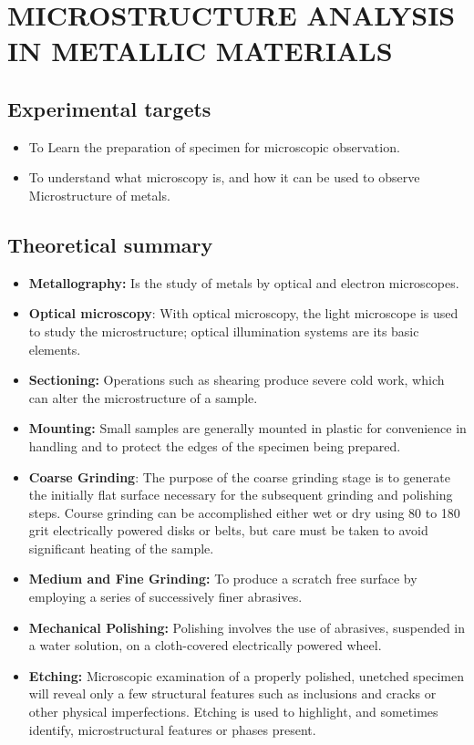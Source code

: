 \chapter{MICROSTRUCTURE ANALYSIS IN METALLIC MATERIALS}
\section{Experimental targets}
\begin{itemize}
	\item To Learn the preparation of specimen for microscopic observation.
	\item To understand what microscopy is, and how it can be used to observe Microstructure of metals.
\end{itemize}
\section{Theoretical summary}
\begin{itemize}
	\item \textbf{Metallography:} Is the study of metals by optical and electron microscopes.
	\item \textbf{Optical microscopy}: With  optical  microscopy,  the  light  microscope  is  used  to  study  the microstructure; optical illumination systems are its basic elements.
	\item \textbf{Sectioning:} Operations  such  as  shearing  produce  severe  cold  work,  which  can  alter  the microstructure of a sample.
	\item \textbf{Mounting:} Small samples are generally mounted in plastic for convenience in handling and to protect the edges of the specimen being prepared.
	\item \textbf{Coarse Grinding}: The purpose of the coarse grinding stage is to generate the initially flat surface necessary for the subsequent grinding and polishing steps. Course grinding can be accomplished either wet or dry using 80 to 180 grit electrically powered disks or belts, but care must be taken to avoid significant heating of the sample.
	\item \textbf{Medium and Fine Grinding:} To produce a scratch free surface by employing a series of successively finer abrasives.
	\item \textbf{Mechanical Polishing:} Polishing involves the use of abrasives, suspended in a water solution, on a cloth-covered electrically powered wheel.
	\item \textbf{Etching:} Microscopic examination of a properly polished, unetched specimen will reveal only a few structural features such as inclusions and cracks or other physical imperfections. Etching is used to highlight, and sometimes identify, microstructural features or phases present.
\end{itemize}
